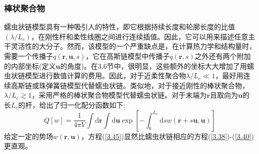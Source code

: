 \subsubsection{棒状聚合物}
蠕虫状链模型具有一种吸引人的特性，即它根据持续长度和轮廓长度的比值$(\lambda/L_c)$，在刚性杆和柔性线圈之间进行连续插值。因此，它可以用来描述任意主干灵活性的大分子。然而，该模型的一个严重缺点是，在计算热力学和结构量时，需要一个传播子$q(\mathbf{r},\mathbf{u},s)$，它在高斯链模型中传播子$q(\mathbf{r},s)$之外还有两个附加的内部坐标(定义$\mathbf{u}$的角度)。在3.6节中，很明显，这些额外的坐标大大增加了用蠕虫状链模型进行数值计算的费用。因此，对于近柔性聚合物$\lambda/L_c\ll 1$，最好用连续高斯链或珠弹簧链模型代替蠕虫状链。类似地，对于接近刚性的棒状聚合物，$\lambda/L_c\gtrsim 1$，采用严格的棒状聚合物模型代替蠕虫状链。对于末端为$\mathbf{r}$且取向为$\mathbf{u}$的长$L_c$的杆，给出了归一化配分函数如下:
\begin{equation}\label{3.45}
Q[w]=\frac{1}{4\pi V}\int\mathrm{d}\mathbf{r}\int\mathrm{d}\mathbf{u}\exp\left[-\int_0^{L_c}\mathrm{d}sw(\mathbf{r}+s\mathbf{u},\mathbf{u})\right]
\end{equation}
给定一定的势场$w(\mathbf{r},\mathbf{u})$，方程(\ref{3.45})显然比蠕虫状链相应的方程(\ref{3.38})-(\ref{3.40})更直观。










































































































